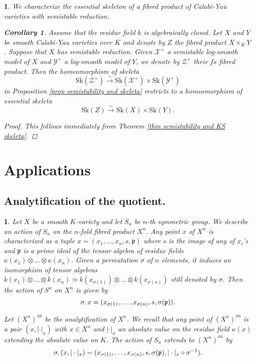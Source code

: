 \documentclass{amsart}%
\numberwithin{equation}{subsection}
\theoremstyle{plain2}
\newtheorem{cor}[equation]{Corollary}
\theoremstyle{definition2}
\theoremstyle{stepstyle}
\theoremstyle{point}
\theoremstyle{subpoint}
\newtheorem{subpoint}[equation]{}%
\newcommand{\spa}[1]{\begin{subpoint}#1\end{subpoint}}           %
\newcommand{\cX}{\ensuremath{\mathscr{X}}}
\newcommand{\fp}{\ensuremath{\mathfrak{p}}}
\newcommand{\cY}{\ensuremath{\mathscr{Y}}}
\newcommand{\cZ}{\ensuremath{\mathscr{Z}}}
\renewcommand{\cZ}{\ensuremath{\mathscr{Z}}}
\renewcommand{\cY}{\ensuremath{\mathscr{Y}}}
\newcommand{\an}{\mathrm{an}}
\newcommand{\Sk}{\mathrm{Sk}}
\begin{document}
\spa{We characterize the essential skeleton of a fibred product of Calabi-Yau varieties with semistable reduction.
\begin{cor}  \label{cor semistability and essential skeleta}
Assume that the residue field $k$ is algebraically closed. Let $X$ and $Y$ be smooth Calabi-Yau varieties over $K$ and denote by $Z$ the fibred product $X\times_K Y$. Suppose that $X$ has semistable reduction. Given $\cX^+$ a semistable log-smooth model of $X$ and $\cY^+$ a log-smooth model of $Y$, we denote by $\cZ^+$ their $fs$ fibred product. Then the homeomorphism of skeleta $$\Sk(\cZ^+) \xrightarrow{\sim} \Sk(\cX^+) \times \Sk(\cY^+)$$ in Proposition \ref{prop semistability and skeleta} restricts to a homeomorphism of essential skeleta $$\Sk(Z) \xrightarrow{\sim} \Sk(X) \times \Sk(Y).$$ 
\end{cor}
\begin{proof}
This follows immediately from Theorem \ref{thm semistability and KS skeleta}.
\end{proof}
}

\section{Applications}
\subsection{Analytification of the quotient.}
\spa{Let $X$ be a smooth $K$-variety and let $S_n$ be $n$-th symmetric group. We describe an action of $S_n$ on the $n$-fold fibred product $X^n$. Any point $x$ of $X^n$ is characterized as a tuple $x=(x_1,\ldots,x_n, s, \fp)$ where $s$ is the image of any of $x_i$'s and $\fp$ is a prime ideal of the tensor algebra of residue fields $\kappa(x_1) \otimes \ldots \otimes \kappa(x_n)$. Given  a permutation $\sigma$ of $n$ elements, it induces an isomorphism of tensor algebras  $k(x_1) \otimes \ldots \otimes k(x_n) \simeq  k(x_{\sigma(1)}) \otimes \ldots \otimes k(x_{\sigma(n)})$ still denoted by $\sigma$. Then the action of $S^n$ on $X^n$ is given by $$\sigma \ldotp x = (x_{\sigma(1)}, \ldots, x_{\sigma(n)}, s, \sigma(\fp)).$$

Let $(X^n)^{\an}$ be the analytification of $X^n$. We recall that any point of $(X^n)^{\an}$ is a pair $(x,|\cdot|_x)$ with $x \in X^n$ and $|\cdot|_x$ an absolute value on the residue field $\kappa(x)$ extending the absolute value on $K$. The action of $S_n$ extends to $(X^n)^\an$ by $$\sigma \ldotp (x,|\cdot|_x) = (x_{\sigma(1)}, \ldots, x_{\sigma(n)}, s, \sigma(\fp), |\cdot|_x \circ \sigma^{-1}).$$}
\end{document}
